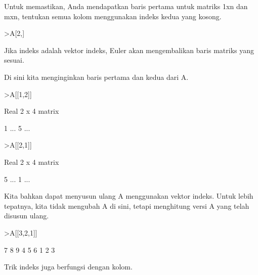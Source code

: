 \documentclass[a4paper,10pt]{article}
\begin{document}
\begin{eulernotebook}
\begin{eulercomment}
\begin{eulercomment}
\begin{eulercomment}
\begin{eulercomment}
\begin{eulercomment}
\begin{eulercomment}
\begin{euleroutput}
\end{euleroutput}
\begin{eulercomment}
Untuk memastikan, Anda mendapatkan baris pertama untuk matriks 1xn dan
mxn, tentukan semua kolom menggunakan indeks kedua yang kosong.
\end{eulercomment}
\begin{eulerprompt}
>A[2,]
\end{eulerprompt}
\begin{euleroutput}
  [4,  5,  6]
\end{euleroutput}
\begin{eulercomment}
Jika indeks adalah vektor indeks, Euler akan mengembalikan baris
matriks yang sesuai.

Di sini kita menginginkan baris pertama dan kedua dari A.
\end{eulercomment}
\begin{eulerprompt}
>A[[1,2]]
\end{eulerprompt}
\begin{euleroutput}
  Real 2 x 4 matrix
  
                        1     ...
                        5     ...
\end{euleroutput}
\begin{eulerprompt}
>A[[2,1]]
\end{eulerprompt}
\begin{euleroutput}
  Real 2 x 4 matrix
  
                        5     ...
                        1     ...
\end{euleroutput}
\begin{eulercomment}
Kita bahkan dapat menyusun ulang A menggunakan vektor indeks. Untuk
lebih tepatnya, kita tidak mengubah A di sini, tetapi menghitung versi
A yang telah disusun ulang.
\end{eulercomment}
\begin{eulerprompt}
>A[[3,2,1]]
\end{eulerprompt}
\begin{euleroutput}
              7             8             9 
              4             5             6 
              1             2             3 
\end{euleroutput}
\begin{eulercomment}
Trik indeks juga berfungsi dengan kolom.


\end{eulercomment}
\end{eulercomment}
\end{eulercomment}
\end{eulercomment}
\end{eulercomment}
\end{eulercomment}
\end{eulercomment}
\end{eulernotebook}
\end{document}
